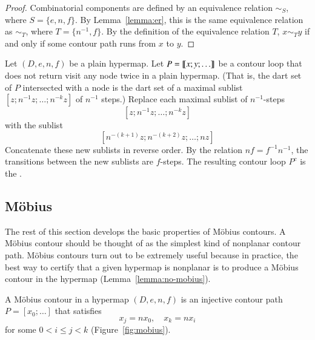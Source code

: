 \begin{proof} 
Combinatorial components are defined by an equivalence relation $\sim_S$, where
$S = \{e,n,f\}$.  By Lemma~\ref{lemma:er}, this is the same equivalence relation as
$\sim_T$, where $T = \{n^{-1},f\}$.  By the definition of the equivalence relation $T$,
$x\sim_T y$ if and only if some contour path runs from $x$ to $y$.
\end{proof}
%

\begin{definition}[complement] 
Let $(D,e,n,f)$ be a plain hypermap.
Let $P={\llbracket{x;y;\ldots}\rrbracket}$ be a contour loop that does not return visit any node
twice in a plain hypermap.   (That is, the dart set of $P$ intersected with a node
is the dart set of a maximal sublist $[z;n^{-1}z;\ldots;n^{-k}z]$ of $n^{-1}$ steps.)
 Replace each maximal sublist of
$n^{-1}$-steps
\[ 
[z;n^{-1} z; \ldots; n^{-k} z]
\] 
with the sublist
\[ 
[n^{-(k+1)} z;n^{-(k+2)} z;\ldots; n z]
\] 
Concatenate these new sublists in reverse order.  By the relation $n f = f^{-1} n^{-1}$,
the transitions between the new sublists are $f$-steps.
The resulting contour loop $P^c$
is the . 
\end{definition}
%

\figJMTLBJN %



\subsection{M\"obius}

The rest of this section develops the basic properties of M\"obius
contours.  A M\"obius contour should be thought of as the simplest
kind of nonplanar contour path.  M\"obius contours turn out to be
extremely useful because in practice, the best way to certify that a
given hypermap is nonplanar is to produce a M\"obius contour in the
hypermap (Lemma~\ref{lemma:no-mobius}).

\begin{definition}
 A M\"obius contour in a hypermap
$(D,e,n,f)$ is an
injective contour path $P=[x_0;\ldots]$ that satisfies
\begin{equation}
\label{eqn:mobius}
x_j = n x_0,\quad x_k = n x_i
\end{equation}
for some $0 < i\le j< k$ (Figure~\ref{fig:mobius}).
%
\end{definition}


